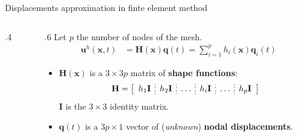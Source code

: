 \documentclass[aspectratio=169]{beamer}
\begin{document}
{{\begin{frame}{Displacements approximation in finte element method}
\begin{columns}[T]
\begin{column}{.4\textwidth}
\begin{center}
\begin{tikzpicture}[scale=2]
            \end{tikzpicture}
          \end{center}
        \end{column}
        \begin{column}{.6\textwidth}
          Let $p$ the number of nodes of the mesh.
          \vspace{-.2cm}
          \begin{align*}
            \mathbf u^{h}(\mathbf x,t) & =\mathbf H(\mathbf x)\mathbf q(t) = \sum_{i=1}^{p}h_{i}(\mathbf x)\mathbf q_{i}(t)
          \end{align*}
          \vspace{-.5cm}
          \begin{itemize}
            \item $\mathbf H(\mathbf x)$ is a $3\times 3p$ matrix of \textbf{shape functions}:
                  $$
                    \mathbf H
                    =\left[
                      \begin{array}{c;{2pt/2pt}c;{2pt/2pt}c;{2pt/2pt}c;{2pt/2pt}c;{2pt/2pt}c}
                        h_{1}\mathbf I & h_{2}\mathbf I & \dots & h_{i}\mathbf I & \dots & h_{p}\mathbf I \\
                      \end{array} \right]
                  $$
                  $\mathbf I$ is the $3\times 3$ identity matrix.
            \item $\mathbf q(t)$ is a $3p\times 1$ vector of (\emph{unknown}) \textbf{nodal displacements}.

          \end{itemize}
        \end{column}
      \end{columns}
    \end{frame}


}}
\end{document}
